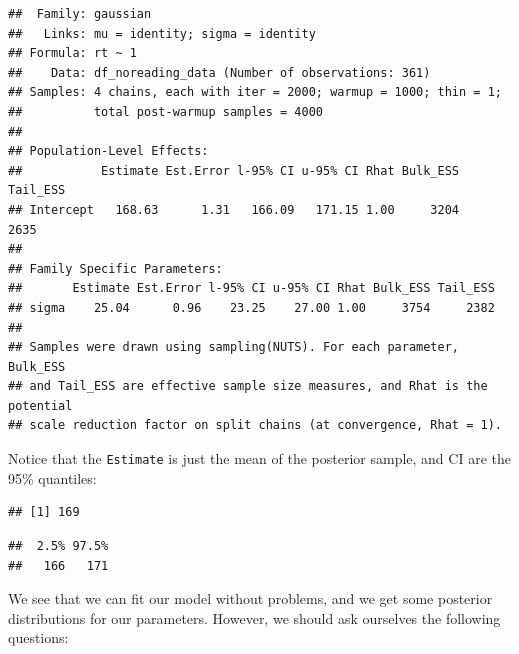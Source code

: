 \documentclass[12pt,]{krantz}
\newenvironment{Shaded}{\begin{snugshade}}{\end{snugshade}}
\newcommand{\KeywordTok}[1]{\textcolor[rgb]{0.13,0.29,0.53}{\textbf{#1}}}
\newcommand{\FloatTok}[1]{\textcolor[rgb]{0.00,0.00,0.81}{#1}}
\newcommand{\StringTok}[1]{\textcolor[rgb]{0.31,0.60,0.02}{#1}}
\newcommand{\OperatorTok}[1]{\textcolor[rgb]{0.81,0.36,0.00}{\textbf{#1}}}
\newcommand{\NormalTok}[1]{#1}
\theoremstyle{definition}
\theoremstyle{definition}
\theoremstyle{definition}
\theoremstyle{remark}
\begin{document}
\begin{verbatim}
##  Family: gaussian 
##   Links: mu = identity; sigma = identity 
## Formula: rt ~ 1 
##    Data: df_noreading_data (Number of observations: 361) 
## Samples: 4 chains, each with iter = 2000; warmup = 1000; thin = 1;
##          total post-warmup samples = 4000
## 
## Population-Level Effects: 
##           Estimate Est.Error l-95% CI u-95% CI Rhat Bulk_ESS Tail_ESS
## Intercept   168.63      1.31   166.09   171.15 1.00     3204     2635
## 
## Family Specific Parameters: 
##       Estimate Est.Error l-95% CI u-95% CI Rhat Bulk_ESS Tail_ESS
## sigma    25.04      0.96    23.25    27.00 1.00     3754     2382
## 
## Samples were drawn using sampling(NUTS). For each parameter, Bulk_ESS
## and Tail_ESS are effective sample size measures, and Rhat is the potential
## scale reduction factor on split chains (at convergence, Rhat = 1).
\end{verbatim}

Notice that the \texttt{Estimate} is just the mean of the posterior
sample, and CI are the 95\% quantiles:

\begin{Shaded}
\end{Shaded}

\begin{verbatim}
## [1] 169
\end{verbatim}

\begin{Shaded}
\end{Shaded}

\begin{verbatim}
##  2.5% 97.5% 
##   166   171
\end{verbatim}

We see that we can fit our model without problems, and we get some
posterior distributions for our parameters. However, we should ask
ourselves the following questions:
\end{document}
